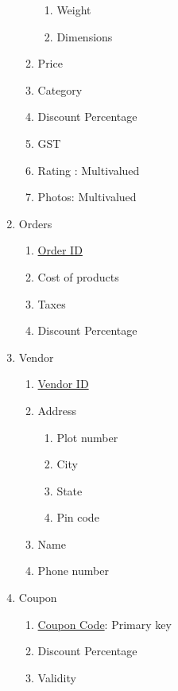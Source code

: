 \documentclass[12pt]{report}
\begin{document}
\begin{enumerate}
\begin{enumerate}
\begin{enumerate}
                        \item Weight 
                        \item Dimensions
                    \end{enumerate}
                \item Price
                \item Category
                \item Discount Percentage
                \item GST
                \item Rating : Multivalued
                \item Photos: Multivalued
            \end{enumerate}
        \item Orders
            \begin{enumerate}
                \item \underline{Order ID}
                \item Cost of products
                \item Taxes
                \item Discount Percentage
            \end{enumerate}
        \item Vendor
            \begin{enumerate}
                \item \underline{Vendor ID}
                \item Address
                    \begin{enumerate}
                        \item Plot number
                        \item City
                        \item State
                        \item Pin code
                    \end{enumerate}
                \item Name
                \item Phone number
            \end{enumerate}
        \item Coupon
            \begin{enumerate}
                \item \underline{Coupon Code}: Primary key
                \item Discount Percentage
                \item Validity

\end{enumerate}
\end{enumerate}
\end{document}

